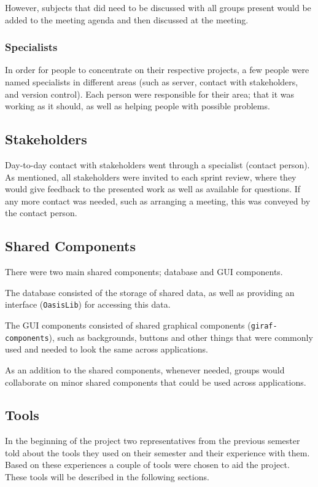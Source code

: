 However, subjects that did need to be discussed with all groups present would be added to the meeting agenda and then discussed at the meeting.

\subsubsection{Specialists}
In order for people to concentrate on their respective projects, a few people were named specialists in different areas (such as server, contact with stakeholders, and version control).
Each person were responsible for their area; that it was working as it should, as well as helping people with possible problems.

\subsection{Stakeholders}
Day-to-day contact with stakeholders went through a specialist (contact person).
As mentioned, all stakeholders were invited to each sprint review, where they would give feedback to the presented work as well as available for questions.
If any more contact was needed, such as arranging a meeting, this was conveyed by the contact person.

\subsection{Shared Components}\label{multiproject:sharedcomponents}
There were two main shared components; database and GUI components.

The database consisted of the storage of shared data, as well as providing an interface (\lstinline|OasisLib|) for accessing this data.

The GUI components consisted of shared graphical components (\lstinline|giraf-components|), such as backgrounds, buttons and other things that were commonly used and needed to look the same across applications.

As an addition to the shared components, whenever needed, groups would collaborate on minor shared components that could be used across applications.

\subsection{Tools}
In the beginning of the project two representatives from the previous semester told about the tools they used on their semester and their experience with them.
Based on these experiences a couple of tools were chosen to aid the project.
These tools will be described in the following sections.

